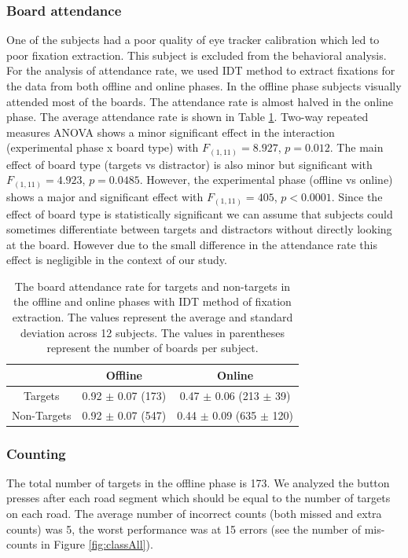 \documentclass[12pt]{iopart}
\begin{document}
\subsubsection*{Board attendance}
One of the subjects
had a poor quality of eye tracker calibration which led
to poor fixation extraction.
This subject is excluded from the behavioral analysis.
For the analysis of attendance rate, we used IDT method to extract fixations 
for the data from both offline and online phases.
In the offline phase subjects visually attended most of the boards. The attendance rate is almost halved in the online phase. 
The average attendance rate
is shown in Table \ref{tab:boardAtt}. 
Two-way repeated measures ANOVA shows a minor significant effect 
in the interaction (experimental phase x board type) with $F_{(1,11)} = 8.927$, $p = 0.012$. 
The main effect of board type (targets vs distractor) is also minor but significant with $F_{(1,11)} = 4.923$, $p =0.0485$. 
However, the experimental phase (offline vs online)
shows a major and significant effect with $F_{(1,11)} = 405$, $p < 0.0001$.
Since the effect of board type is statistically significant
we can assume that subjects could sometimes differentiate between targets
and distractors without directly looking at the board.
However due to the small difference in the attendance rate
this effect is negligible in the context of our study.


\begin{table}
    \centering
    \caption{The board attendance rate for targets and non-targets in the offline and online phases with IDT method of fixation
        extraction.
    The values represent the average and standard deviation across 12 subjects.
The values in parentheses represent the number of boards per subject.}
    \begin{tabular}{c | c | c}
        \hline 
        & Offline & Online \\
        \hline 
        Targets & 0.92 $\pm$ 0.07 (173) & 0.47 $\pm$ 0.06 (213 $\pm$ 39)\\
        Non-Targets & 0.92 $\pm$ 0.07 (547) & 0.44 $\pm$ 0.09  (635 $\pm$ 120)\\
        \hline 
    \end{tabular}
    \label{tab:boardAtt}
\end{table}




\subsubsection*{Counting}
The total number of targets in the offline phase is 173.
We analyzed the button presses after each road segment
which should be equal to the number of targets
on each road.
The average number of incorrect counts (both missed and extra counts) was 5,
the worst performance was at 15 errors (see the number of mis-counts in Figure \ref{fig:classAll}).
\end{document}
